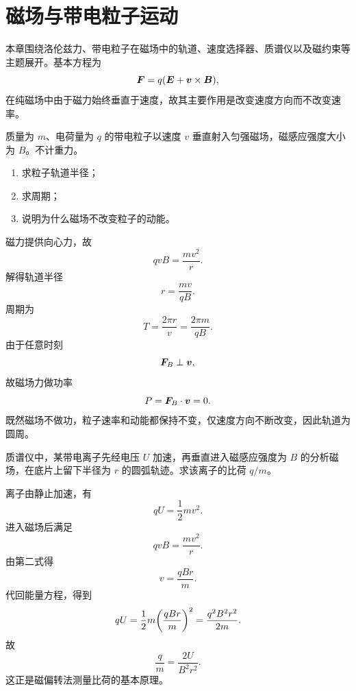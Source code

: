 \chapter{磁场与带电粒子运动}

本章围绕洛伦兹力、带电粒子在磁场中的轨道、速度选择器、质谱仪以及磁约束等主题展开。基本方程为
\[
\vb*{F}=q\qty(\vb*{E}+\vb*{v}\times \vb*{B}),
\]
在纯磁场中由于磁力始终垂直于速度，故其主要作用是改变速度方向而不改变速率。

\begin{classic}
质量为 $m$、电荷量为 $q$ 的带电粒子以速度 $v$ 垂直射入匀强磁场，磁感应强度大小为 $B$。不计重力。
\begin{enumerate}
  \item 求粒子轨道半径；
  \item 求周期；
  \item 说明为什么磁场不改变粒子的动能。
\end{enumerate}

\begin{solution}
磁力提供向心力，故
\[
qvB=\frac{mv^2}{r}.
\]
解得轨道半径
\[
r=\frac{mv}{qB}.
\]
周期为
\[
T=\frac{2\pi r}{v}=\frac{2\pi m}{qB}.
\]
由于任意时刻
\[
\vb*{F}_B\perp \vb*{v},
\]
故磁场力做功率
\[
P=\vb*{F}_B\cdot \vb*{v}=0.
\]
既然磁场不做功，粒子速率和动能都保持不变，仅速度方向不断改变，因此轨道为圆周。
\end{solution}
\end{classic}

\begin{classic}
质谱仪中，某带电离子先经电压 $U$ 加速，再垂直进入磁感应强度为 $B$ 的分析磁场，在底片上留下半径为 $r$ 的圆弧轨迹。求该离子的比荷 $q/m$。

\begin{solution}
离子由静止加速，有
\[
qU=\frac12 mv^2.
\]
进入磁场后满足
\[
qvB=\frac{mv^2}{r}.
\]
由第二式得
\[
v=\frac{qBr}{m}.
\]
代回能量方程，得到
\[
qU=\frac12 m\qty(\frac{qBr}{m})^2=\frac{q^2B^2r^2}{2m}.
\]
故
\[
\frac{q}{m}=\frac{2U}{B^2r^2}.
\]
这正是磁偏转法测量比荷的基本原理。
\end{solution}
\end{classic}

